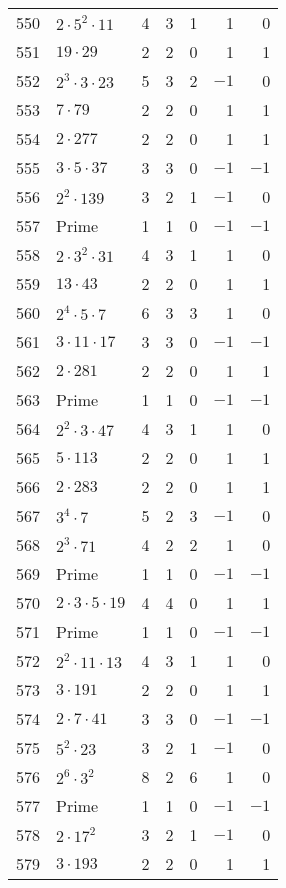 \documentclass[12pt]{article}
\begin{document}
\begin{tabular}{|r|l|r|r|r|r|r|}
550 & $2 \cdot 5^2 \cdot 11$ & 4 & 3 & 1 & 1 & 0 \\
551 & $19 \cdot 29$ & 2 & 2 & 0 & 1 & 1 \\
552 & $2^3 \cdot 3 \cdot 23$ & 5 & 3 & 2 & $-1$ & 0 \\
553 & $7 \cdot 79$ & 2 & 2 & 0 & 1 & 1 \\
554 & $2 \cdot 277$ & 2 & 2 & 0 & 1 & 1 \\
555 & $3 \cdot 5 \cdot 37$ & 3 & 3 & 0 & $-1$ & $-1$ \\
556 & $2^2 \cdot 139$ & 3 & 2 & 1 & $-1$ & 0 \\
557 & Prime & 1 & 1 & 0 & $-1$ & $-1$ \\
558 & $2 \cdot 3^2 \cdot 31$ & 4 & 3 & 1 & 1 & 0 \\
559 & $13 \cdot 43$ & 2 & 2 & 0 & 1 & 1 \\
560 & $2^4 \cdot 5 \cdot 7$ & 6 & 3 & 3 & 1 & 0 \\
561 & $3 \cdot 11 \cdot 17$ & 3 & 3 & 0 & $-1$ & $-1$ \\
562 & $2 \cdot 281$ & 2 & 2 & 0 & 1 & 1 \\
563 & Prime & 1 & 1 & 0 & $-1$ & $-1$ \\
564 & $2^2 \cdot 3 \cdot 47$ & 4 & 3 & 1 & 1 & 0 \\
565 & $5 \cdot 113$ & 2 & 2 & 0 & 1 & 1 \\
566 & $2 \cdot 283$ & 2 & 2 & 0 & 1 & 1 \\
567 & $3^4 \cdot 7$ & 5 & 2 & 3 & $-1$ & 0 \\
568 & $2^3 \cdot 71$ & 4 & 2 & 2 & 1 & 0 \\
569 & Prime & 1 & 1 & 0 & $-1$ & $-1$ \\
570 & $2 \cdot 3 \cdot 5 \cdot 19$ & 4 & 4 & 0 & 1 & 1 \\
571 & Prime & 1 & 1 & 0 & $-1$ & $-1$ \\
572 & $2^2 \cdot 11 \cdot 13$ & 4 & 3 & 1 & 1 & 0 \\
573 & $3 \cdot 191$ & 2 & 2 & 0 & 1 & 1 \\
574 & $2 \cdot 7 \cdot 41$ & 3 & 3 & 0 & $-1$ & $-1$ \\
575 & $5^2 \cdot 23$ & 3 & 2 & 1 & $-1$ & 0 \\
576 & $2^6 \cdot 3^2$ & 8 & 2 & 6 & 1 & 0 \\
577 & Prime & 1 & 1 & 0 & $-1$ & $-1$ \\
578 & $2 \cdot 17^2$ & 3 & 2 & 1 & $-1$ & 0 \\
579 & $3 \cdot 193$ & 2 & 2 & 0 & 1 & 1 \\

\end{tabular}
\end{document}

